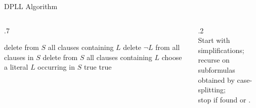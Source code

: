 \documentclass[t]{sdqbeamer}
\begin{document}
\begin{frame}{DPLL Algorithm}
	\centering
	\begin{minipage}{0.95\textwidth}
		\begin{columns}[T]
			\begin{column}{.7\linewidth}
				\begin{algorithm}[H]
					\DontPrintSemicolon
					\caption{DPLL(ClauseSet $S$)}
					 {
						delete from $S$ all clauses containing $L$ 
						delete $\lnot L$ from all clauses in $S$ 
					}
					 { 
						\Return {}  
					}
					 {
						delete from $S$ all clauses containing $L$ 
					}
					 { 
						\Return {}  
					}
					choose a literal $L$ occurring in $S$ 
					 { 
						\Return true  
					}
					 { 
						\Return true  
					}
				\end{algorithm}
			\end{column}
			\begin{column}{.2\linewidth}
				~\\[1em]
				Start with simplifications;\\[1em]
				recurse on subformulas obtained by case-splitting;\\[1em]
				stop if  found or .
			\end{column}
		\end{columns}
	\end{minipage}
\end{frame}
\end{document}
